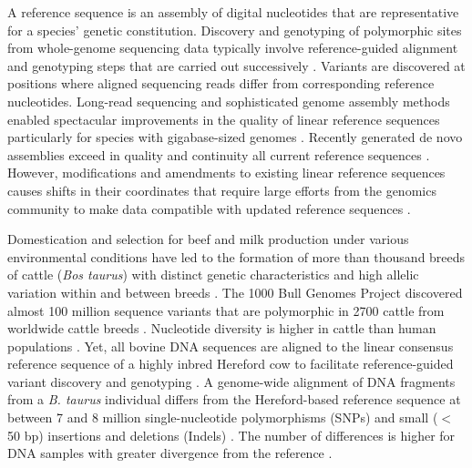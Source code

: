 \documentclass[../main.tex]{subfiles}
\begin{document}
\doublespacing 
\normalsize

A reference sequence is an assembly of digital nucleotides that are representative for a species’ genetic constitution. 
Discovery and genotyping of polymorphic sites from whole-genome sequencing data typically involve reference-guided alignment and genotyping steps that are carried out successively \citep{depristo2011framework}. 
Variants are discovered at positions where aligned sequencing reads differ from corresponding reference nucleotides. Long-read sequencing and sophisticated genome assembly methods enabled spectacular improvements in the quality of linear reference sequences particularly for species with gigabase-sized genomes \citep{koren2018novo}. Recently generated de novo assemblies exceed in quality and continuity all current reference sequences \citep{miga2020telomere,rice2020continuous}. However, modifications and amendments to existing linear reference sequences causes shifts in their coordinates that require large efforts from the genomics community to make data compatible with updated reference sequences \citep{ballouz2019time}.

Domestication and selection for beef and milk production under various environmental conditions have led to the formation of more than thousand breeds of cattle (\emph{Bos taurus}) with distinct genetic characteristics and high allelic variation within and between breeds \citep{scherf2015second}. The 1000 Bull Genomes Project discovered almost 100 million sequence variants that are polymorphic in 2700 cattle from worldwide cattle breeds \citep{daetwyler2014whole,hayes20191000}. Nucleotide diversity is higher in cattle than human populations \citep{daetwyler2014whole,charlier2016ngs}. Yet, all bovine DNA sequences are aligned to the linear consensus reference sequence of a highly inbred Hereford cow to facilitate reference-guided variant discovery and genotyping \citep{worley2012sequencing,elsik2009genome}. A genome-wide alignment of DNA fragments from a \emph{B. taurus} individual differs from the Hereford-based reference sequence at between 7 and 8 million single-nucleotide polymorphisms (SNPs) and small ($<$ 50 bp) insertions and deletions (Indels) \citep{crysnanto2019accurate,jansen2013assessment}. The number of differences is higher for DNA samples with greater divergence from the reference \citep{kim2017genome,koufariotis2018sequencing}.
\end{document}
